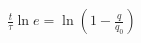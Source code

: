 \documentclass[preview]{standalone}
\begin{document}
\begin{align*}
\frac{t}{\tau} \ln e = \ln\left(1 - \frac{q}{q_{0}}\right)
\end{align*}
\end{document}
